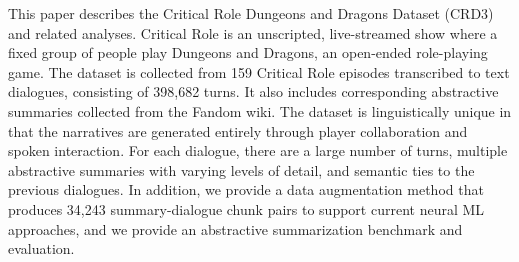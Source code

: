 This paper describes the {Critical Role Dungeons and Dragons Dataset} ({CRD3}) and related analyses. {Critical Role} is an unscripted, live-streamed show where a fixed group of people play {Dungeons and Dragons}, an open-ended role-playing game. The dataset is collected from 159 {Critical Role} episodes transcribed to text dialogues, consisting of 398,682 turns. It also includes corresponding abstractive summaries collected from the {Fandom} wiki. The dataset is linguistically unique in that the narratives are generated entirely through player collaboration and spoken interaction. For each dialogue, there are a large number of turns, multiple abstractive summaries with varying levels of detail, and semantic ties to the previous dialogues. {I}n addition, we  provide a data augmentation method that produces 34,243 summary-dialogue chunk pairs to support current neural {ML} approaches, and we provide an abstractive summarization benchmark and evaluation.
